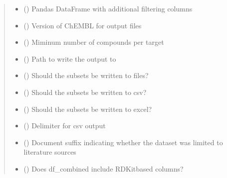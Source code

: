 \documentclass[letterpaper,10pt,english]{sphinxmanual}
\begin{document}
\begin{fulllineitems}
\begin{quote}
\begin{description}
\begin{itemize}
\item {} 
\sphinxAtStartPar
{} () \textendash{} Pandas DataFrame with additional filtering columns

\item {} 
\sphinxAtStartPar
{} () \textendash{} Version of ChEMBL for output files

\item {} 
\sphinxAtStartPar
{} () \textendash{} Miminum number of compounds per target

\item {} 
\sphinxAtStartPar
{} () \textendash{} Path to write the output to

\item {} 
\sphinxAtStartPar
{} () \textendash{} Should the subsets be written to files?

\item {} 
\sphinxAtStartPar
{} () \textendash{} Should the subsets be written to csv?

\item {} 
\sphinxAtStartPar
{} () \textendash{} Should the subsets be written to excel?

\item {} 
\sphinxAtStartPar
{} () \textendash{} Delimiter for csv output

\item {} 
\sphinxAtStartPar
{} () \textendash{} Document suffix indicating whether the dataset was limited to literature sources

\item {} 
\sphinxAtStartPar
{} () \textendash{} Does df\_combined include RDKit\sphinxhyphen{}based columns?


\end{itemize}
\end{description}
\end{quote}
\end{fulllineitems}
\end{document}
